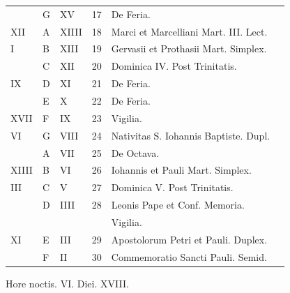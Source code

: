 \begin{center}
\begin{tabular}{l | l | l | r | l l}
\color{Red}  & G & \color{Red} XV & 17 & De Feria. \\
\color{Red} XII & \color{Red} A & \color{Red} XIIII & 18 & \color{Red} Marci et Marcelliani Mart. III. Lect. \\
\color{Red} I & B & \color{Red} XIII & 19 & \color{Red} Gervasii et Prothasii Mart. Simplex. \\
\color{Red}  & C & \color{Red} XII & 20 & Dominica IV. Post Trinitatis. & \color{Red} \\
\color{Red} IX & D & \color{Red} XI & 21 & De Feria. & \color{Red} \\
\color{Red}  & E & \color{Red} X & 22 & De Feria. & \color{Red} \\
\color{Red} XVII & F & \color{Red} IX & 23 & \qquad Vigilia. \color{Red} \\
\color{Red} VI & G & \color{Red} VIII & 24 & Nativitas S. Iohannis Baptiste. Dupl. \\
\color{Red}  & \color{Red} A & \color{Red} VII & 25 & De Octava. & \color{Red} \\
\color{Red} XIIII & B & \color{Red} VI & 26 & Iohannis et Pauli Mart. Simplex. & \color{Red} \\
\color{Red} III & C & \color{Red} V & 27 & Dominica V. Post Trinitatis. \\
\color{Red}  & D & \color{Red} IIII & 28 & Leonis Pape et Conf. Memoria. \\
 &  &  &  & \qquad Vigilia. \color{Red} \\
\color{Red} XI & E & \color{Red} III & 29 & Apostolorum Petri et Pauli. Duplex. & \color{Red} \\
\color{Red}  & F & \color{Red} II & 30 & Commemoratio Sancti Pauli. \color{Red} Semid. \\
\end{tabular}
\newline \color{Red} Hore noctis. VI. Diei. XVIII.
\end{center}



\newpage
\color{Red}\color{black}


